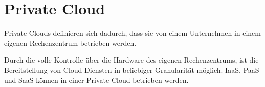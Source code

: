 \documentclass[../main.tex]{subfiles}
\begin{document}




  \section{Private Cloud}
  \label{privateCloud}
    Private Clouds definieren sich dadurch, dass sie von einem Unternehmen in einem eigenen Rechenzentrum betrieben werden.

    Durch die volle Kontrolle über die Hardware des eigenen Rechenzentrums, ist die Bereitstellung von Cloud-Diensten in beliebiger Granularität möglich. IaaS, PaaS und SaaS können in einer Private Cloud betrieben werden.
\end{document}
